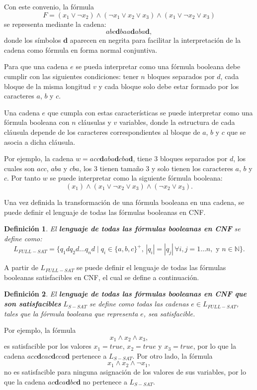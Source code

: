 \documentclass{article}
\newtheorem{definition}{Definición}
\begin{document}
Con este convenio, la fórmula
$$ F=(x_1 \vee \neg x_2) \wedge (\neg x_1 \vee x_2 \vee x_3) \wedge (x_1 \vee \neg x_2 \vee x_3)$$
se representa mediante la cadena:
$$abc\mathbf{d}baa\mathbf{d}aba\mathbf{d},$$
donde los símbolos $\mathbf{d}$ aparecen en negrita para facilitar la interpretación de la cadena como fórmula
en forma normal conjuntiva.

Para que una cadena $e$ se pueda interpretar como una fórmula booleana debe cumplir con las siguientes condiciones:
tener $n$ bloques separados por $d$, cada bloque de la misma longitud $v$ y cada bloque solo debe estar formado por los caracteres
$a$, $b$ y $c$.

Una cadena $e$ que cumpla con estas características  se puede interpretar como una fórmula booleana con $n$ cláusulas y $v$ variables, donde la estructura de cada cláusula depende de los caracteres correspondientes al bloque de $a$, $b$ y $c$ que se asocia a dicha cláusula.

Por ejemplo, la cadena $w=acc\mathbf{d}aba\mathbf{d}cba\mathbf{d}$, tiene 3 bloques separados por $d$, los cuales son $acc$, $aba$ y $cba$, los 3 tienen tamaño 3 y solo tienen los caracteres $a$, $b$ y $c$.
Por tanto  $w$ se puede interpretar como la siguiente fórmula booleana:
$$(x_1)\wedge(x_1\vee \neg x_2 \vee x_3) \wedge (\neg x_2\vee x_3).$$

Una vez definida la transformación de una fórmula booleana en una cadena, se puede definir el lenguaje de todas las fórmulas booleanas en CNF.

\begin{definition}
    El \textbf{lenguaje de todas las fórmulas booleanas en CNF} se define como:
    \[
        L_{FULL-SAT} = \{ q_1dq_2d\dots q_nd \mid q_i \in \{a, b,c\}^+\text{, }
        |q_i| = |q_j| \, \forall i, j =1\dots n, \text{ y } n\in \mathbb{N}\}.
    \]
\end{definition}

A partir de $L_{FULL-SAT}$ se puede definir el lenguaje de todas las fórmulas booleanas satisfacibles
en CNF, el cual se define a continuación.

\begin{definition}
    El \textbf{lenguaje de todas las fórmulas booleanas en CNF que son satisfacibles} $L_{S-SAT}$ se define como todas las cadenas $e\in L_{FULL-SAT}$,
    tales que la fórmula booleana que representa $e$, sea satisfacible.
\end{definition}

Por ejemplo, la fórmula $$x_1\wedge x_2 \wedge x_3,$$ es satisfacible por los valores $x_1=true$, $x_2=true$ y $x_3=true$, por lo que la
cadena $acc\mathbf{d}cac\mathbf{d}cca\mathbf{d}$ pertenece a $L_{S-SAT}$. Por otro lado, la fórmula $$x_1\wedge x_2 \wedge \neg x_1,$$
no es satisfacible para ninguna asignación de los valores de sus variables, por lo que la cadena $ac\mathbf{d}ca\mathbf{d}bc\mathbf{d}$
no pertenece a $L_{S-SAT}$.
\end{document}
